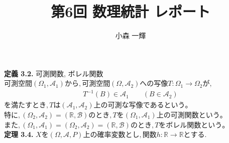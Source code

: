 \documentclass[dvipdfmx,10pt, a4j]{jarticle}
\title{第6回 数理統計 レポート}
\author{小森 一輝}
\theoremstyle{definition}
\begin{document}
\maketitle

\setcounter{section}{2}

    \noindent
    \textbf{定義 3.2.} 可測関数, ボレル関数\\
    $可測空間(\Omega_1, \mathcal{A}_1) から, 可測空間(\Omega, \mathcal{A}_2)への写像T : \Omega_1 \to \Omega_2が,$\\
    \begin{align*}
        T^{-1}(B) \in \mathcal{A}_1 \qquad (B \in \mathcal{A}_2)
    \end{align*}
    $を満たすとき, Tは(\mathcal{A}_1, \mathcal{A}_2) 上の \textbf{可測な写像}であるという。$
    $特に, (\Omega_2, \mathcal{A}_2) = (\mathbb{R}, \mathcal{B})のとき, Tを(\Omega_1, \mathcal{A}_1)上の \textbf{可測関数} という。$
    $また, (\Omega_1, \mathcal{A}_1) = (\Omega_2, \mathcal{A}_2) = (\mathbb{R}, \mathcal{B}) のとき, Tを \textbf{ボレル関数} という。$\\

    \noindent
    \textbf{定理 3.4.} $Xを (\Omega, \mathcal{A}, P)上の確率変数とし, 関数h: \mathbb{R} \to \mathbb{R} とする.$\\
    
\end{document}
